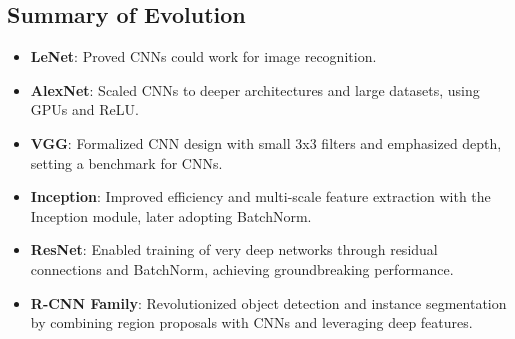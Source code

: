 \begin{notechapter}
\section{Summary of Evolution}
\begin{itemize}
  \item \textbf{LeNet}: Proved CNNs could work for image recognition.
  \item \textbf{AlexNet}: Scaled CNNs to deeper architectures and large 
    datasets, using GPUs and ReLU.
  \item \textbf{VGG}: Formalized CNN design with small 3x3 filters and 
    emphasized depth, setting a benchmark for CNNs.
  \item \textbf{Inception}: Improved efficiency and multi-scale feature 
    extraction with the Inception module, later adopting BatchNorm.
  \item \textbf{ResNet}: Enabled training of very deep networks through 
    residual connections and BatchNorm, achieving groundbreaking 
    performance.
  \item \textbf{R-CNN Family}: Revolutionized object detection and 
    instance segmentation by combining region proposals with CNNs and 
    leveraging deep features.
\end{itemize}
\end{notechapter}
